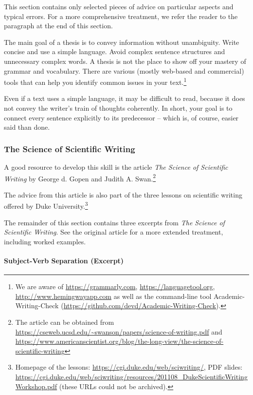 This section contains only selected pieces of advice on particular aspects and typical errors. For a more comprehensive treatment, we refer the reader to the paragraph  at the end of this section.

The main goal of a thesis is to convey information without unambiguity. Write concise and use a simple language. Avoid complex sentence structures and unnecessary complex words. A thesis is not the place to show off your mastery of grammar and vocabulary. There are various (mostly web-based and commercial) tools that can help you identify common issues in your text.\footnote{We are aware of \url{https://grammarly.com}, \url{https://languagetool.org}, \url{http://www.hemingwayapp.com} as well as the command-line tool Academic-Writing-Check (\url{https://github.com/devd/Academic-Writing-Check}).}

Even if a text uses a simple language, it may be difficult to read, because it does not convey the writer's train of thoughts coherently. In short, your goal is to connect every sentence explicitly to its predecessor – which is, of course, easier said than done.

\subsubsection{The Science of Scientific Writing}

A good resource to develop this skill is the article \emph{The Science of Scientific Writing} by George d. Gopen and Judith A. Swan.\footnote{The article can be obtained from \url{https://cseweb.ucsd.edu/~swanson/papers/science-of-writing.pdf} and \url{https://www.americanscientist.org/blog/the-long-view/the-science-of-scientific-writing}} 

The advice from this article is also part of the three lessons on scientific writing offered by Duke University.\footnote{Homepage of the lessons: \url{https://cgi.duke.edu/web/sciwriting/}, PDF slides: \url{https://cgi.duke.edu/web/sciwriting/resources/201108_DukeScientificWritingWorkshop.pdf} (these URLs could not be archived).}

The remainder of this section contains three excerpts from \emph{The Science of Scientific Writing}. See the original article for a more extended treatment, including worked examples.

\paragraph{Subject-Verb Separation (Excerpt)}

